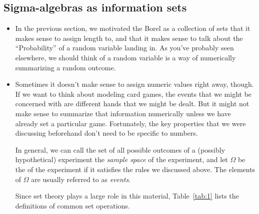 \subsection{Sigma-algebras as information sets}

\begin{itemize}

\item In the previous section, we motivated the Borel \sigmaalgebra as a
  collection of sets that it makes sense to assign length to, and that
  it makes sense to talk about the ``Probability'' of a random
  variable landing in.  As you've probably seen elsewhere, we should
  think of a random variable is a way of numerically summarizing a
  random outcome.

\item Sometimes it doesn't make sense to assign numeric values right
  away, though.  If we want to think about modeling card games, the
  events that we might be concerned with are different hands that we
  might be dealt.  But it might not make sense to summarize that
  information numerically unless we have already set a particular
  game.  Fortunately, the key properties that we were discussing
  beforehand don't need to be specific to numbers.

  In general, we can call the set of all possible outcomes of a
  (possibly hypothetical) experiment the \emph{sample space} of the
  experiment, and let $\Omega$ be the \emph{\sigmaalgebra} of the experiment if
  it satisfies the rules we discussed above.  The elements of $\Omega$ are
  usually referred to as \emph{events}.

  Since set theory plays a large role in this material,
  Table~\ref{tab:1} lists the definitions of common set operations.


\end{itemize}
